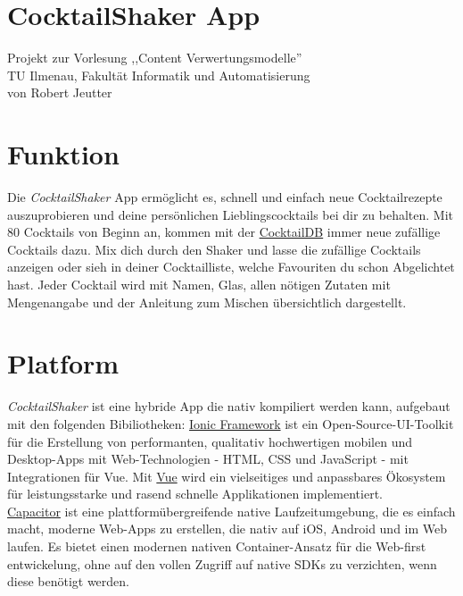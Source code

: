\documentclass[a4paper, 10pt]{article}
\begin{document}
\section*{\centering CocktailShaker App}

\vspace{\baselineskip}
\begin{center}
    Projekt zur Vorlesung ,,Content Verwertungsmodelle''\\
    TU Ilmenau, Fakultät Informatik und Automatisierung \\
    von Robert Jeutter
\end{center}
\bigskip

\begin{multicols}{2}

    \section{Funktion}
    Die \textit{CocktailShaker} App ermöglicht es, schnell und einfach neue Cocktailrezepte auszuprobieren und deine persönlichen Lieblingscocktails bei dir zu behalten.
    Mit 80 Cocktails von Beginn an, kommen mit der \href{https://www.thecocktaildb.com/}{CocktailDB} immer neue zufällige Cocktails dazu. Mix dich durch den Shaker und lasse die zufällige Cocktails anzeigen oder sieh in deiner Cocktailliste, welche Favouriten du schon Abgelichtet hast.
    Jeder Cocktail wird mit Namen, Glas, allen nötigen Zutaten mit Mengenangabe und der Anleitung zum Mischen übersichtlich dargestellt.

    \section{Platform}
    \textit{CocktailShaker} ist eine hybride App die nativ kompiliert werden kann, aufgebaut mit den folgenden Bibiliotheken:
    \href{https://github.com/ionic-team/ionic}{Ionic Framework} ist ein Open-Source-UI-Toolkit für die Erstellung von performanten, qualitativ hochwertigen mobilen und Desktop-Apps mit Web-Technologien - HTML, CSS und JavaScript - mit Integrationen für Vue. Mit \href{https://github.com/vuejs/vue}{Vue} wird ein vielseitiges und anpassbares Ökosystem für leistungsstarke und rasend schnelle Applikationen implementiert.\\
    \href{https://github.com/ionic-team/capacitor}{Capacitor} ist eine plattformübergreifende native Laufzeitumgebung, die es einfach macht, moderne Web-Apps zu erstellen, die nativ auf iOS, Android und im Web laufen. Es bietet einen modernen nativen Container-Ansatz für die Web-first entwickelung, ohne auf den vollen Zugriff auf native SDKs zu verzichten, wenn 
    diese benötigt werden.


\end{multicols}
\end{document}
